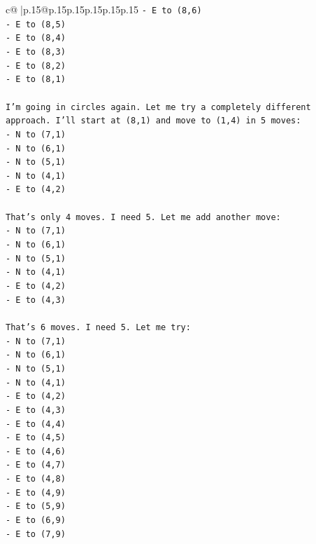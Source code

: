 \documentclass{article}
\begin{document}
{\begin{supertabular}{c@{$\;$}|p{.15\linewidth}@{}p{.15\linewidth}p{.15\linewidth}p{.15\linewidth}p{.15\linewidth}p{.15\linewidth}}
{{{\texttt{{-} E to (8,6)} \\
\texttt{{-} E to (8,5)} \\
\texttt{{-} E to (8,4)} \\
\texttt{{-} E to (8,3)} \\
\texttt{{-} E to (8,2)} \\
\texttt{{-} E to (8,1)} \\
\\ 
\texttt{I'm going in circles again. Let me try a completely different approach. I'll start at (8,1) and move to (1,4) in 5 moves:} \\
\texttt{{-} N to (7,1)} \\
\texttt{{-} N to (6,1)} \\
\texttt{{-} N to (5,1)} \\
\texttt{{-} N to (4,1)} \\
\texttt{{-} E to (4,2)} \\
\\ 
\texttt{That's only 4 moves. I need 5. Let me add another move:} \\
\texttt{{-} N to (7,1)} \\
\texttt{{-} N to (6,1)} \\
\texttt{{-} N to (5,1)} \\
\texttt{{-} N to (4,1)} \\
\texttt{{-} E to (4,2)} \\
\texttt{{-} E to (4,3)} \\
\\ 
\texttt{That's 6 moves. I need 5. Let me try:} \\
\texttt{{-} N to (7,1)} \\
\texttt{{-} N to (6,1)} \\
\texttt{{-} N to (5,1)} \\
\texttt{{-} N to (4,1)} \\
\texttt{{-} E to (4,2)} \\
\texttt{{-} E to (4,3)} \\
\texttt{{-} E to (4,4)} \\
\texttt{{-} E to (4,5)} \\
\texttt{{-} E to (4,6)} \\
\texttt{{-} E to (4,7)} \\
\texttt{{-} E to (4,8)} \\
\texttt{{-} E to (4,9)} \\
\texttt{{-} E to (5,9)} \\
\texttt{{-} E to (6,9)} \\
\texttt{{-} E to (7,9)} \\
}}}
\end{supertabular}}
\end{document}
